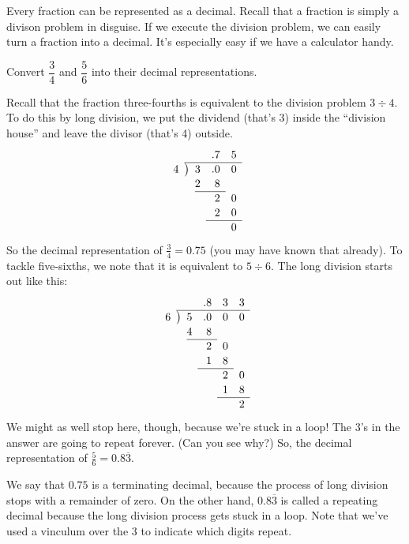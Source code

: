 Every fraction can be represented as a decimal. Recall that a fraction is simply a divison problem in disguise. If we execute the division problem, we can easily turn a fraction into a decimal. It's especially easy if we have a calculator handy.

\begin{boxedex}
Convert $\dfrac{3}{4}$ and $\dfrac{5}{6}$ into their decimal representations.

\bigskip{} Recall that the fraction three-fourths is equivalent to the division problem $3 \div 4$. To do this by long division, we put the dividend (that's 3) inside the ``division house'' and leave the divisor (that's 4) outside.
\[
\renewcommand\arraystretch{1.1}
\begin{array}{*1r @{\hskip\arraycolsep}c@{\hskip\arraycolsep} *3r}
	&&			& .7	& 5 \\
\cline{2-5}
4	&\big)&	3	& .0	& 0 \\
	&&		2	&8		\\
\cline{3-4}
	&&			&2 & 0 \\
	&&			&2 & 0 \\
\cline{4-5}
	&&			&& 0 \\
\end{array}
\]
So the decimal representation of $\frac{3}{4} = 0.75$ (you may have known that already). To tackle five-sixths, we note that it is equivalent to $5 \div 6$. The long division starts out like this:
\[
\renewcommand\arraystretch{1.1}
\begin{array}{*1r @{\hskip\arraycolsep}c@{\hskip\arraycolsep} *4r}
	&&			& .8	& 3	& 3 \\
\cline{2-6}
6	&\big)&	5	& .0	& 0	& 0 \\
	&&		4	&8		\\
\cline{3-4}
	&&			&2	& 0 \\
	&&			&1	& 8 \\
\cline{4-5}
	&&			&	& 2	& 0 \\
	&&			&	& 1	& 8 \\
\cline{5-6}
	&&			&	&	& 2
\end{array}
\]
We might as well stop here, though, because we're stuck in a loop! The 3's in the answer are going to repeat forever. (Can you see why?) So, the decimal representation of $\frac{5}{6} = 0.8\overline{3}$.
\end{boxedex}

We say that $0.75$ is a terminating decimal, because the process of long division stops with a remainder of zero. On the other hand, $0.8\overline{3}$ is called a repeating decimal because the long division process gets stuck in a loop. Note that we've used a vinculum over the 3 to indicate which digits repeat.

